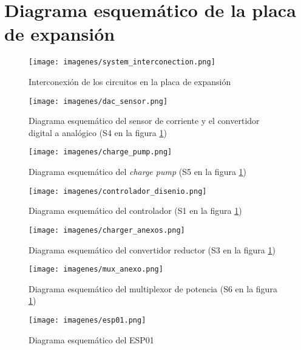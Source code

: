\section{Diagrama esquemático de la placa de expansión}
\label{sec:anexo_esquematico}

\begin{figure}[H]
    \centering
    \texttt{[image: imagenes/system\_interconection.png]}
    \caption{Interconexión de los circuitos en la placa de expansión}
    \label{fig:all}    
\end{figure}

\begin{figure}[H]
    \centering
    \texttt{[image: imagenes/dac\_sensor.png]}
    \caption{Diagrama esquemático del sensor de corriente y el convertidor digital a analógico
    (S4 en la figura \ref{fig:all})}
    \label{fig:dac_sensor}
\end{figure}


\begin{figure}[H]
    \centering
    \texttt{[image: imagenes/charge\_pump.png]}
    \caption{Diagrama esquemático del \textit{charge pump} (S5 en la figura \ref{fig:all})}
    \label{fig:charge_pump_anexo}
\end{figure}


\begin{figure}[H]
    \centering
    \texttt{[image: imagenes/controlador\_disenio.png]}
    \caption{Diagrama esquemático del controlador (S1 en la figura \ref{fig:all})}
    \label{fig:controlador_anexo}
\end{figure}

\begin{figure}[H]
    \centering
    \texttt{[image: imagenes/charger\_anexos.png]}
    \caption{Diagrama esquemático del convertidor reductor (S3 en la figura \ref{fig:all})}
    \label{fig:charger_anexo}
\end{figure}

\begin{figure}[H]
    \centering
    \texttt{[image: imagenes/mux\_anexo.png]}
    \caption{Diagrama esquemático del multiplexor de potencia (S6 en la figura \ref{fig:all})}
    \label{fig:charger_anexo_mux}  
\end{figure}

\begin{figure}[H]
    \centering
    \texttt{[image: imagenes/esp01.png]}
    \caption{Diagrama esquemático del ESP01}
    \label{fig:esp01_anexo}
\end{figure}

